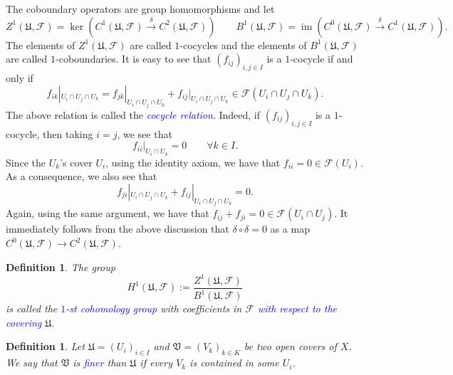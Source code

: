 \documentclass[10pt]{article}
\theoremstyle{thmstyle}
\theoremstyle{defstyle}
\newtheorem{definition}[theorem]{Definition}
\newcommand{\im}{\operatorname{im}}
\newcommand{\frakU}{\mathfrak{U}}
\newcommand{\frakV}{\mathfrak{V}}
\newcommand{\scrF}{\mathscr{F}}
\newcommand{\define}[1]{\textcolor{blue}{\textit{#1}}}
\begin{document}
The coboundary operators are group homomorphisms and let
\begin{equation*}
    Z^1(\frakU,\scrF) = \ker\left(C^1(\frakU,\scrF)\xrightarrow\delta C^2(\frakU,\scrF)\right)\qquad B^1(\frakU,\scrF) = \im\left(C^0(\frakU,\scrF)\xrightarrow{\delta} C^1(\frakU,\scrF)\right).
\end{equation*}
The elements of $Z^1(\frakU,\scrF)$ are called $1$-cocycles and the elements of $B^1(\frakU,\scrF)$ are called $1$-coboundaries. It is easy to see that $(f_{ij})_{i,j\in I}$ is a $1$-cocycle if and only if 
\begin{equation*}
    f_{ik}|_{U_i\cap U_j\cap U_k} = f_{jk}|_{U_i\cap U_j\cap U_k} + f_{ij}|_{U_i\cap U_j\cap U_k}\in\scrF(U_i\cap U_j\cap U_k).
\end{equation*}
The above relation is called the \define{cocycle relation}. Indeed, if $(f_{ij})_{i, j\in I}$ is a $1$-cocycle, then taking $i = j$, we see that 
\begin{equation*}
    f_{ii}|_{U_i\cap U_k} = 0\qquad\forall k\in I.
\end{equation*}
Since the $U_k$'s cover $U_i$, using the identity axiom, we have that $f_{ii} = 0\in\scrF(U_i)$. As a consequence, we also see that 
\begin{equation*}
    f_{ji}|_{U_i\cap U_j\cap U_k} + f_{ij}|_{U_i\cap U_j\cap U_k} = 0.
\end{equation*}
Again, using the same argument, we have that $f_{ij} + f_{ji} = 0\in\scrF(U_i\cap U_j)$. It immediately follows from the above discussion that $\delta\circ\delta = 0$ as a map $C^0(\frakU,\scrF)\to C^2(\frakU,\scrF)$.

\begin{definition}
    The group 
    \begin{equation*}
        H^1(\frakU,\scrF) := \frac{Z^1(\frakU,\scrF)}{B^1(\frakU,\scrF)}
    \end{equation*}
    is called the \define{$1$-st cohomology group} with coefficients in $\scrF$ \define{with respect to the covering} $\frakU$.
\end{definition}

\begin{definition}
    Let $\frakU = (U_i)_{i\in I}$ and $\frakV = (V_k)_{k\in K}$ be two open covers of $X$. We say that $\frakV$ is \define{finer} than $\frakU$ if every $V_k$ is contained in some $U_i$.
\end{definition}
\end{document}
